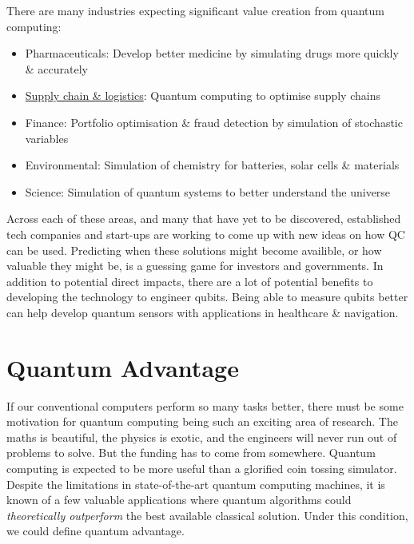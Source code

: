 \documentclass{book}
\begin{document}
There are many industries expecting significant value creation from quantum computing: 

\begin{itemize}
        
    \item Pharmaceuticals: Develop better medicine by simulating drugs more quickly \& accurately  
    \item \hyperlink{https://www.youtube.com/watch?v=jA7iopqDm94}{Supply chain \& logistics}: Quantum computing to optimise supply chains 
    \item Finance: Portfolio optimisation \& fraud detection by simulation of stochastic variables
    \item Environmental: Simulation of chemistry for batteries, solar cells \& materials
    \item Science: Simulation of quantum systems to better understand the universe
    
\end{itemize}

Across each of these areas, and many that have yet to be discovered, established tech companies and start-ups are working to come up with new ideas on how QC can be used. Predicting when these solutions might become availible, or how valuable they might be, is a guessing game for investors and governments. In addition to potential direct impacts, there are a lot of potential benefits to developing the technology to engineer qubits. Being able to measure qubits better can help develop quantum sensors with applications in healthcare \& navigation. 

\section{Quantum Advantage} 

If our conventional computers perform so many tasks better, there must be some motivation for quantum computing being such an exciting area of research. The maths is beautiful, the physics is exotic, and the engineers will never run out of problems to solve. But the funding has to come from somewhere. Quantum computing is expected to be more useful than a glorified coin tossing simulator. Despite the limitations in state-of-the-art quantum computing machines, it is known of a few valuable applications where quantum algorithms could \textit{theoretically outperform} the best available classical solution. Under this condition, we could define quantum advantage. 
\end{document}
